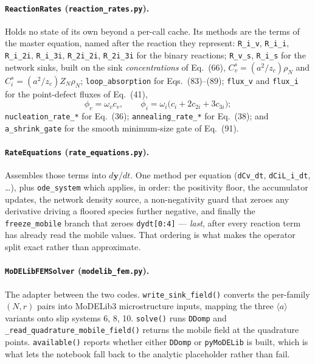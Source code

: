 \documentclass[11pt]{article}
\newcommand{\aloop}{\ensuremath{\langle a\rangle}}
\newcommand{\MoD}{\textsf{MoDELib3}}
\newcommand{\code}[1]{\texttt{\small #1}}
\newcommand{\file}[1]{\texttt{\footnotesize #1}}
\newcommand{\dref}[1]{Eq.~(#1)}
\newcommand{\drefs}[2]{Eqs.~(#1)--(#2)}
\begin{document}
\paragraph*{\code{ReactionRates} (\file{reaction\_rates.py}).}
Holds no state of its own beyond a per-call cache. Its methods are the terms of
the master equation, named after the reaction they represent: \code{R\_i\_v},
\code{R\_i\_i}, \code{R\_i\_2i}, \code{R\_i\_3i}, \code{R\_2i\_2i},
\code{R\_2i\_3i} for the binary reactions; \code{R\_v\_s}, \code{R\_i\_s} for the
network sinks, built on the sink \emph{concentrations} of \dref{66},
$C^s_v = (a^2/z_c)\rho_N$ and $C^s_i = (a^2/z_c)Z_N\rho_N$;
\code{loop\_absorption} for \drefs{83}{89}; \code{flux\_v} and \code{flux\_i} for
the point-defect fluxes of \dref{41},
\begin{equation}
\phi_v = \omega_v c_v, \qquad
\phi_i = \omega_i\bigl(c_i + 2c_{2i} + 3c_{3i}\bigr);
\label{eq:fluxes}
\end{equation}
\code{nucleation\_rate\_*} for \dref{36}; \code{annealing\_rate\_*} for
\dref{38}; and \code{a\_shrink\_gate} for the smooth minimum-size gate of
\dref{91}.

\paragraph*{\code{RateEquations} (\file{rate\_equations.py}).}
Assembles those terms into $d\boldsymbol{y}/dt$. One method per equation
(\code{dCv\_dt}, \code{dCiL\_i\_dt}, \dots), plus \code{ode\_system} which
applies, in order: the positivity floor, the accumulator updates, the network
density source, a non-negativity guard that zeroes any derivative driving a
floored species further negative, and finally the \code{freeze\_mobile} branch
that zeroes \code{dydt[0:4]} --- \emph{last}, after every reaction term has
already read the mobile values. That ordering is what makes the operator split
exact rather than approximate.

\paragraph*{\code{MoDELibFEMSolver} (\file{modelib\_fem.py}).}
The adapter between the two codes. \code{write\_sink\_field()} converts the
per-family $(N, r)$ pairs into \MoD{} microstructure inputs, mapping the three
\aloop{} variants onto slip systems 6, 8, 10. \code{solve()} runs \code{DDomp}
and \code{\_read\_quadrature\_mobile\_field()} returns the mobile field at the
quadrature points. \code{available()} reports whether either \code{DDomp} or
\code{pyMoDELib} is built, which is what lets the notebook fall back to the
analytic placeholder rather than fail.
\end{document}
